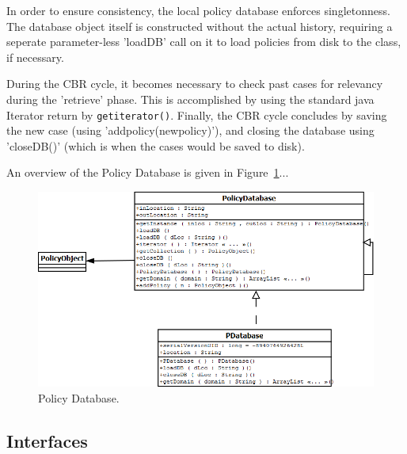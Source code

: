 In order to ensure consistency, the local policy database enforces singletonness. The database object itself is constructed without the actual history, requiring a seperate parameter-less 'loadDB' call on it to load policies from disk to the class, if necessary.

During the CBR cycle, it becomes necessary to check past cases for relevancy during the 'retrieve' phase. This is accomplished by using the standard java Iterator return by \texttt{getiterator()}.
Finally, the CBR cycle concludes by saving the new case (using 'addpolicy(newpolicy)'), and closing the database using 'closeDB()' (which is when the cases would be saved to disk).

An overview of the Policy Database is given in Figure~\ref{pd_fig}...



\begin{figure}[htbp]
\begin{center}
\includegraphics[width = \textwidth]{DesignReport/uml/pd.png}
\caption{Policy Database.}
\label{pd_fig}
\end{center}
\end{figure}

\subsection{Interfaces}

      



